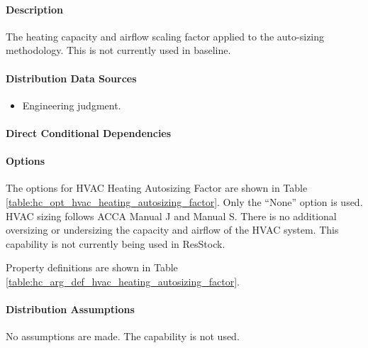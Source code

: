 \paragraph{Description}
% 
The heating capacity and airflow scaling factor applied to the auto-sizing methodology. This is not currently used in baseline.  

\paragraph{Distribution Data Sources}
% 
\begin{itemize}
    \item Engineering judgment.
\end{itemize}

\paragraph{Direct Conditional Dependencies}


\paragraph{Options}
The options for HVAC Heating Autosizing Factor are shown in Table \ref{table:hc_opt_hvac_heating_autosizing_factor}. Only the ``None'' option is used. HVAC sizing follows ACCA Manual J and Manual S. There is no additional oversizing or undersizing the capacity and airflow of the HVAC system. This capability is not currently being used in ResStock.



Property definitions are shown in Table \ref{table:hc_arg_def_hvac_heating_autosizing_factor}.



\paragraph{Distribution Assumptions}
% 
No assumptions are made. The capability is not used.
